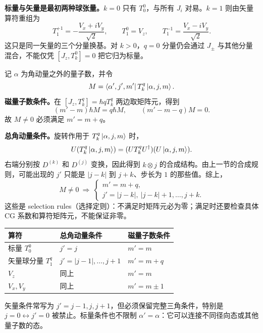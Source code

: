 \textbf{标量与矢量是最初两种球张量。}$k=0$ 只有 $T_0^0$，与所有 $J_i$ 对易。$k=1$ 则由矢量算符重组为
\begin{equation}
  \boxed{T_1^{+1}=-\frac{V_x+iV_y}{\sqrt2},\qquad
    T_1^0=V_z,\qquad T_1^{-1}=\frac{V_x-iV_y}{\sqrt2}.}
\end{equation}
这只是同一矢量的三个分量换基。对 $k>0$，$q=0$ 分量仍会通过 $J_\pm$ 与其他分量混合，不能仅凭 $[J_z,T_k^0]=0$ 把它归为标量。

记 $\alpha$ 为角动量之外的量子数，并令
\begin{equation}
  M=\left\langle \alpha',j',m'\right|T_k^q\left|\alpha,j,m\right\rangle.
\end{equation}
\textbf{磁量子数条件。}在 $[J_z,T_k^q]=\hbar qT_k^q$ 两边取矩阵元，得到
\begin{equation}
  (m'-m)\hbar M=q\hbar M,
  \qquad (m'-m-q)M=0.
\end{equation}
故 $M\ne0$ 必须满足 $m'=m+q$。

\textbf{总角动量条件。}旋转作用于 $T_k^q\left|\alpha,j,m\right\rangle$ 时，
\begin{equation}
  U(T_k^q\left|\alpha,j,m\right\rangle)
    =(UT_k^qU^\dagger)(U\left|\alpha,j,m\right\rangle).
\end{equation}
右端分别按 $D^{(k)}$ 和 $D^{(j)}$ 变换，因此得到 $k\otimes j$ 的合成结构。由上一节的合成规则，可能出现的 $j'$ 只能是 $|j-k|$ 到 $j+k$、步长为 $1$ 的那些值。综上，
\begin{equation}
  \boxed{M\ne0\ \Longrightarrow\
    \begin{cases}
      m'=m+q,\\
      j'=|j-k|,\ |j-k|+1,\ldots,j+k.
    \end{cases}}
\end{equation}
这些是 selection rules（选择定则）：不满足时矩阵元必为零；满足时还要检查具体 CG 系数和算符矩阵元，不能保证非零。

\begin{center}
\begin{tabularx}{\textwidth}{@{}lXX@{}}
  \toprule
  算符 & 总角动量条件 & 磁量子数条件 \\
  \midrule
  标量 $T_0^0$ & $j'=j$ & $m'=m$ \\
  矢量球分量 $T_1^q$ & $j'=|j-1|,\ldots,j+1$ & $m'=m+q$ \\
  $V_z$ & 同上 & $m'=m$ \\
  $V_x,V_y$ & 同上 & $m'=m\pm1$ \\
  \bottomrule
\end{tabularx}
\end{center}
矢量条件常写为 $j'=j-1,j,j+1$，但必须保留完整三角条件，特别是 $j=0\leftrightarrow j'=0$ 被禁止。标量条件也不限制 $\alpha'=\alpha$：它可以连接不同径向态或其他量子数的态。

